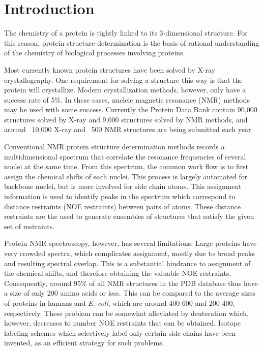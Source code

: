 \chapter{Introduction}

The chemistry of a protein is tightly linked to its 3-dimensional structure.
For this reason, protein structure determination is the basis of rational understanding of the chemistry of biological processes involving proteins.

Most currently known protein structures have been solved by X-ray crystallography.
One requirement for solving a structure this way is that the protein will crystallize.
Modern crystallization methods, however, only have a success rate of 5\%\cite{xray}.
In these cases, nucleic magnetic resonance (NMR) methods may be used with some success.
Currently the Protein Data Bank contain 90,000 structures solved by X-ray and 9,000 structures solved by NMR methods, and around ~10,000 X-ray and ~500 NMR structures are being submitted each year\cite{PDB}

Conventional NMR protein structure determination methods records a multidimensional spectrum that correlate the resonance frequencies of several nuclei at the same time.
From this spectrum, the common work flow is to first assign the chemical shifts of each nuclei.
This process is largely automated for backbone nuclei, but is more involved for side chain atoms.
This assignment information is used to identify peaks in the spectrum which correspond to distance restraints (NOE restraints) between pairs of atoms.
These distance restraints are the used to generate ensembles of structures that satisfy the given set of restraints.

Protein NMR spectroscopy, however, has several limitations.
Large proteins have very crowded spectra, which complicates assignment, mostly due to broad peaks and resulting spectral overlap.
This is a substantial hindrance to assignment of the chemical shifts, and therefore obtaining the valuable NOE restraints.
Consequently, around 95\% of all NMR structures in the PDB database thus have a size of only 200 amino acids or less.
This can be compared to the average sizes of proteins in humans and \textit{E. coli}, which are around 400-600 and 200-400, respectively.
These problem can be somewhat alleviated by deuteration which, however, decreases to number NOE restraints that can be obtained.
Isotope labeling schemes which selectively label only certain side chains have been invented, as an efficient strategy for such problems.

